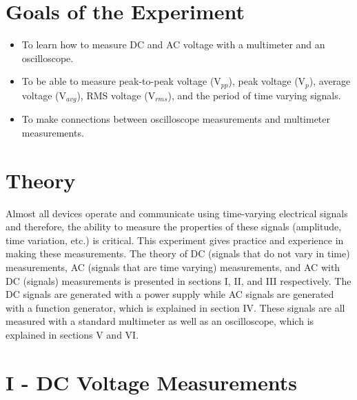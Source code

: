 \section{{\bf Goals of the Experiment}}
\begin{itemize}
    \item To learn how to measure DC and AC voltage with a multimeter and an oscilloscope.
    \item To be able to measure peak-to-peak voltage (V$_{pp}$), peak voltage (V$_p$), average voltage (V$_{avg}$), RMS voltage (V$_{rms}$), and the period of time varying signals.
    \item To make connections between oscilloscope measurements and multimeter measurements.
\end{itemize}

\section{{\bf Theory}}
Almost all devices operate and communicate using time-varying electrical signals and therefore, the ability to measure the properties of these signals (amplitude, time variation, etc.) is critical. This experiment gives practice and experience in making these measurements. The theory of DC (signals that do not vary in time) measurements, AC (signals that are time varying) measurements, and AC with DC (signals) measurements is presented in sections I, II, and III respectively. The DC signals are generated with a power supply while AC signals are generated with a function generator, which is explained in section IV. These signals are all measured with a standard multimeter as well as an oscilloscope, which is explained in sections V and VI.

\section{{\bf I - DC Voltage Measurements}}

